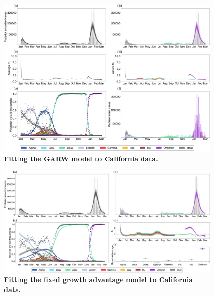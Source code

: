 \documentclass[11pt,oneside,letterpaper]{article}
\begin{document}
\clearpage 

\begin{figure}
  \centering
  \includegraphics[width=\linewidth]{figs/GARW_rt_California.png}
  \caption{\textbf{Fitting the GARW model to California data.}}%
  \label{fig:GARW_rt_California}
\end{figure}

\begin{figure}
  \centering
  \includegraphics[width=\linewidth]{figs/fixed_growth_California.png}
  \caption{\textbf{Fitting the fixed growth advantage model to California data.}}%
  \label{fig:fixed_growth_California}
\end{figure}
\end{document}
